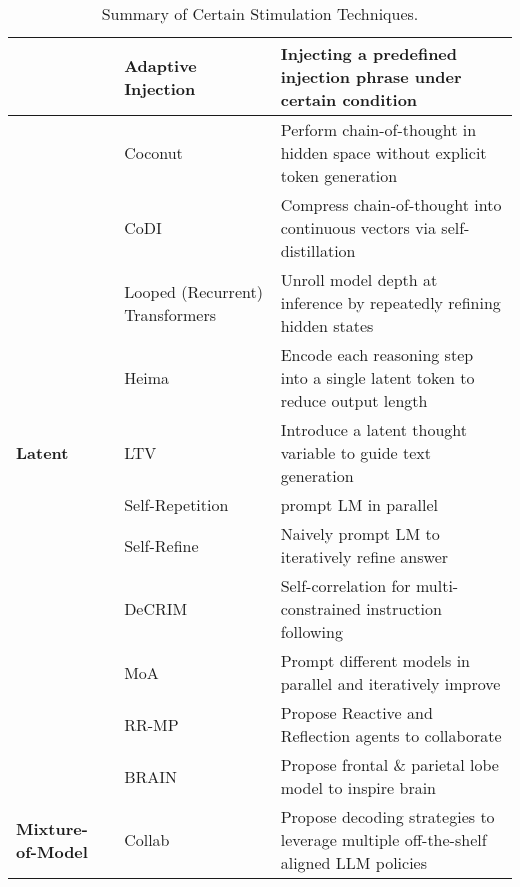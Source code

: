 \begin{table*}[!htbp]
{\begin{tabular}{lll}
        & Adaptive Injection~\citep{jin2025wellthinkingenhancingllm} & Injecting a predefined injection phrase under certain condition \\
    \midrule
        & Coconut~\citep{hao2024training} & Perform chain-of-thought in hidden space without explicit token generation \\
        & CoDI~\citep{shen2025codicompressingchainofthoughtcontinuous} & Compress chain-of-thought into continuous vectors via self-distillation \\
        & Looped (Recurrent) Transformers~\citep{saunshi2025reasoninglatentthoughtspower} & Unroll model depth at inference by repeatedly refining hidden states \\
        & Heima~\citep{shen2025efficientreasoninghiddenthinking} & Encode each reasoning step into a single latent token to reduce output length \\
        \multirow{-5}{*}{\textbf{Latent}}
        & LTV~\citep{kong2025scalablelanguagemodelsposterior} & Introduce a latent thought variable to guide text generation \\
    \midrule
        \rowcolor{gray!10}
        & Self-Repetition~\citep{wang2023selfconsistency} & prompt LM in parallel \\
        \rowcolor{gray!10}
        & Self-Refine~\citep{madaan2023selfrefine} & Naively prompt LM to iteratively refine answer \\
        \rowcolor{gray!10}\multirow{-3}{*}{\textbf{Self-Repetition}}
        & DeCRIM~\citep{ferraz2024llmselfcorrectiondecrimdecompose} & Self-correlation for multi-constrained instruction following \\
    \midrule
        & MoA~\citep{wang2025mixtureofagents} & Prompt different models in parallel and iteratively improve \\
        & RR-MP~\citep{he2025enhancingllmreasoningmultipath} & Propose Reactive and Reflection agents to collaborate \\
        & BRAIN~\citep{chen2024braininspiredtwostageapproachenhancing} & Propose frontal \& parietal lobe model to inspire brain \\
        \multirow{-4}{*}{\textbf{Mixture-of-Model}}
        & Collab~\citep{chakraborty2025collab} & Propose decoding strategies to leverage multiple off-the-shelf aligned LLM policies \\
    \bottomrule
    \end{tabular}}
    \caption{Summary of Certain Stimulation Techniques.}
    \label{tab:stimulation}
\end{table*}